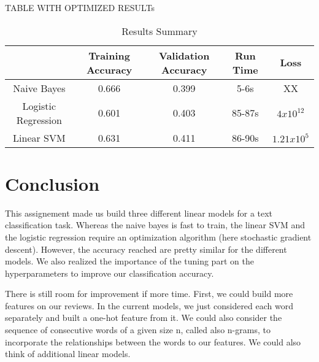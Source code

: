 \documentclass[11pt]{article}
\begin{document}
TABLE WITH OPTIMIZED RESULTs


\begin{table}[]
\centering
\caption{Results Summary}
\label{my-label}
\begin{tabular}{c|c|c|c|c|}
\cline{2-5}
\multicolumn{1}{l|}{}                     & Training Accuracy & Validation Accuracy & Run Time & Loss                      \\ \hline
\multicolumn{1}{|c|}{Naive Bayes}         & 0.666             & 0.399               & 5-6s     &         XX                  \\ \cline{1-1}
\multicolumn{1}{|c|}{Logistic Regression} & 0.601             & 0.403               & 85-87s   & $4x10^12$   \\ \cline{1-1}
\multicolumn{1}{|c|}{Linear SVM}          & 0.631             & 0.411               & 86-90s   & $1.21x10^5$ \\ \hline
\end{tabular}
\end{table}



\section{Conclusion}


This assignement made us build three different linear models for a text classification task. Whereas the naive bayes is fast to train, the linear SVM and the logistic regression require an optimization algorithm (here stochastic gradient descent). However, the accuracy reached are pretty similar for the different models. We also realized the importance of the tuning part on the hyperparameters to improve our classification accuracy.

There is still room for improvement if more time. First, we could build more features on our reviews. In the current models, we just considered each word separately and built a one-hot feature from it. We could also consider the sequence of consecutive words of a given size n, called also n-grams, to incorporate the relationships between the words to our features. We could also think of additional linear models.



\end{document}
